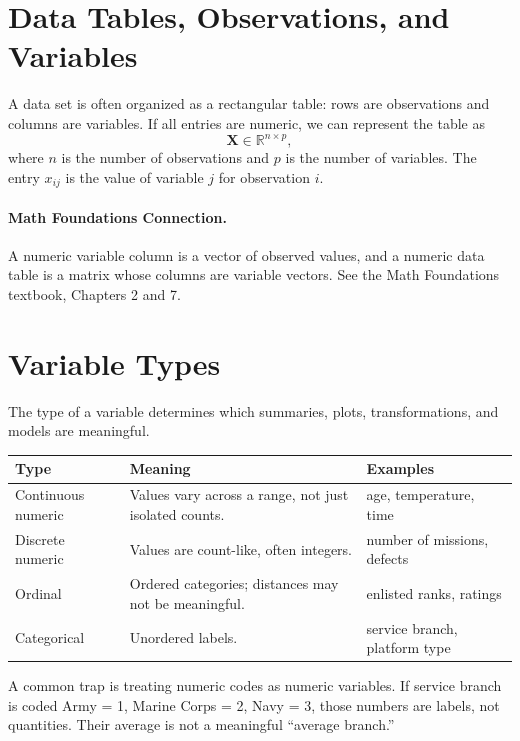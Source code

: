 {\section{Data Tables, Observations, and Variables}

A data set is often organized as a rectangular table: rows are observations and columns are variables.  If all entries are numeric, we can represent the table as
\begin{equation}
  \mathbf{X}\in\mathbb{R}^{n\times p},
  \label{eq:ch3-data-matrix}
\end{equation}
where $n$ is the number of observations and $p$ is the number of variables.  The entry $x_{ij}$ is the value of variable $j$ for observation $i$.

\paragraph{Math Foundations Connection.}
A numeric variable column is a vector of observed values, and a numeric data table is a matrix whose columns are variable vectors.  See the Math Foundations textbook, Chapters 2 and 7.

\section{Variable Types}

The type of a variable determines which summaries, plots, transformations, and models are meaningful.
\begin{center}
\begin{tabular}{p{}p{}p{}}
\toprule
\textbf{Type} & \textbf{Meaning} & \textbf{Examples} \\
\midrule
Continuous numeric & Values vary across a range, not just isolated counts. & age, temperature, time \\
Discrete numeric & Values are count-like, often integers. & number of missions, defects \\
Ordinal & Ordered categories; distances may not be meaningful. & enlisted ranks, ratings \\
Categorical & Unordered labels. & service branch, platform type \\
\bottomrule
\end{tabular}
\end{center}
A common trap is treating numeric codes as numeric variables.  If service branch is coded Army = 1, Marine Corps = 2, Navy = 3, those numbers are labels, not quantities.  Their average is not a meaningful ``average branch.''

}
